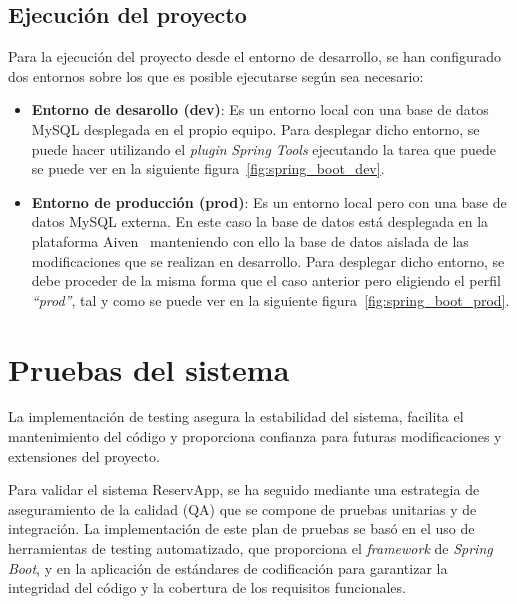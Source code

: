 \subsection{Ejecución del proyecto}

Para la ejecución del proyecto desde el entorno de desarrollo, se han configurado dos entornos sobre los que es posible ejecutarse según sea necesario:
\begin{itemize}
   \item \textbf{Entorno de desarollo (dev)}: Es un entorno local con una base de datos MySQL desplegada en el propio equipo. Para desplegar dicho entorno, se puede hacer utilizando el \emph{plugin} \textit{Spring Tools} ejecutando la tarea que puede se puede ver en la siguiente figura~\ref{fig:spring_boot_dev}.

   
   \item \textbf{Entorno de producción (prod)}: Es un entorno local pero con una base de datos MySQL externa. En este caso la base de datos está desplegada en la plataforma Aiven~\cite{aiven} manteniendo con ello la base de datos aislada de las modificaciones que se realizan en desarrollo. Para desplegar dicho entorno, se debe proceder de la misma forma que el caso anterior pero eligiendo el perfil \emph{``prod''}, tal y como se puede ver en la siguiente figura~\ref{fig:spring_boot_prod}.

\end{itemize}

\section{Pruebas del sistema}
La implementación de testing asegura la estabilidad del sistema, facilita el mantenimiento del código y proporciona confianza para futuras modificaciones y extensiones del proyecto.

Para validar el sistema ReservApp, se ha seguido mediante una estrategia de aseguramiento de la calidad (QA) que se compone de pruebas unitarias y de integración. La implementación de este plan de pruebas se basó en el uso de herramientas de testing automatizado, que proporciona el \emph{framework} de \textit{Spring Boot}, y en la aplicación de estándares de codificación para garantizar la integridad del código y la cobertura de los requisitos funcionales.

